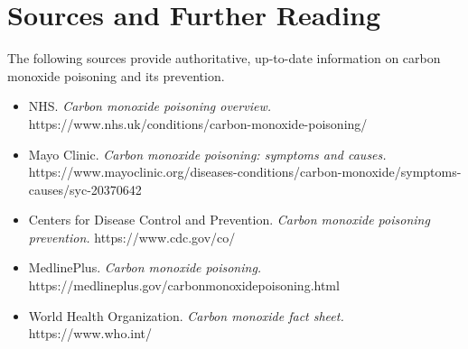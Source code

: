 \section*{Sources and Further Reading}
The following sources provide authoritative, up-to-date information on carbon monoxide poisoning and its prevention.
\begin{itemize}
    \item NHS. \textit{Carbon monoxide poisoning overview.} https://www.nhs.uk/conditions/carbon-monoxide-poisoning/
    \item Mayo Clinic. \textit{Carbon monoxide poisoning: symptoms and causes.} https://www.mayoclinic.org/diseases-conditions/carbon-monoxide/symptoms-causes/syc-20370642
    \item Centers for Disease Control and Prevention. \textit{Carbon monoxide poisoning prevention.} https://www.cdc.gov/co/
    \item MedlinePlus. \textit{Carbon monoxide poisoning.} https://medlineplus.gov/carbonmonoxidepoisoning.html
    \item World Health Organization. \textit{Carbon monoxide fact sheet.} https://www.who.int/
\end{itemize}
